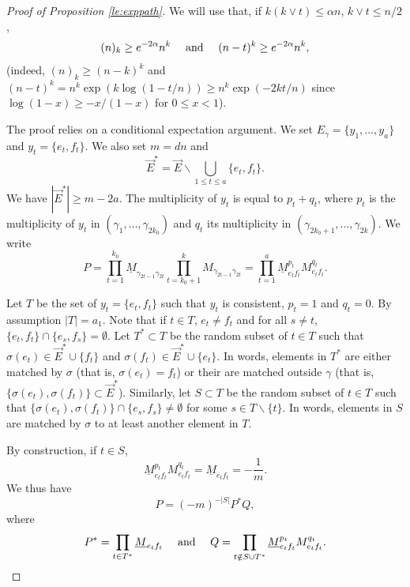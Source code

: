 \documentclass[11pt]{article}
\newcommand{\cE}{E}
\newcommand{\1}{1\!\!{\sf I}}\newcommand{\IND}{\1}
\begin{document}
\begin{proof}[Proof of Proposition \ref{le:exppath}] We will use that, if $k ( k \vee t)  \leq \alpha n$, $k \vee t \leq n/2$,  
\begin{equation}\label{eq:factpow}
(n)_k \geq   e^{-2\alpha} n^k  \quad  \hbox{ and } \quad (n - t )^k \geq e^{-2\alpha} n^k,
\end{equation}
(indeed, $(n)_k \geq (n - k)^k$ and $(n-t)^k =  n^{k} \exp ( k \log ( 1 - t /n)) \geq n^{k} \exp ( - 2 k t / n)$ since $\log (1 -x) \geq - x / (1 - x)$ for $0 \leq x  <1$). 

The proof relies on a conditional expectation argument. We set $\cE_\gamma = \{ y_1, \ldots , y_a  \}$ and $y_{t} = \{ e_t , f_t \}$. We also set $m = d n$ and
$$\vec E^* = \vec E \backslash \bigcup_{1 \leq t \leq a} \{ e_{t} , f_{t}  \}.$$
We have $| \vec E^* | \geq  m - 2 a$. The multiplicity of $y_t$ is equal to $p_t + q_t$, where $p_t$ is the multiplicity of $y_t$ in $(\gamma_1, \ldots, \gamma_{2k_0})$ and $q_t$ its multiplicity in $(\gamma_{2k_0 +1}, \ldots, \gamma_{2k})$.  We write 
$$
P =  \prod_{t= 1} ^{k_0}  \underline M_{\gamma_{2t-1} \gamma_{2t} } \prod_{t= k_0+1} ^{k}  M_{\gamma_{2t-1} \gamma_{2t} }  = \prod_{t=1}^a  \underline M_{e_tf_t} ^{p_t}  M_{e_tf_t} ^{q_t} . 
$$

Let $T$ be the set of $y_t = \{e_t , f_t \}$ such that $y_t$ is consistent, $p_t = 1$ and $q_t = 0$.  By assumption $|T| = a_1$. Note that if $t \in T$, $e_t \ne f_t$ and for all $s \ne t$, $\{ e_t,f_t \} \cap \{ e_s, f_s\} = \emptyset$. Let $T^*\subset T$ be the random subset of $t \in T$ such that $\sigma(e_t) \in \vec  E^* \cup \{ f_t \}$ and $\sigma(f_t) \in \vec E^* \cup \{ e_t \}$. In words, elements in $T^*$ are either  matched by $\sigma$ (that is, $\sigma(e_t) = f_t$) or their are matched outside $\gamma$ (that is, $\{ \sigma(e_t) , \sigma(f_t)\} \subset  \vec E^*$).  Similarly, let $S \subset T$ be the random subset of $t \in T$ such that $\{ \sigma(e_t) , \sigma(f_t) \} \cap  \{  e_s, f_s \} \ne \emptyset $ for some $s \in T \backslash \{t \}$. In words, elements in $S$ are matched by $\sigma$ to at least another element in $T$. 


By construction, if $t \in S$, 
$$
 \underline M_{e_tf_t} ^{p_t}  M_{e_tf_t} ^{q_t} =  \underline M_{e_tf_t}   =  -\frac 1 m.
$$
We thus have 
$$
P = (-m)^{-|S|} P^* Q,
$$
where 
$$
P^*  = \prod_{t \in T^*}  \underline M_{e_tf_t}  \quad \hbox{ and } \quad Q =  \prod_{t\notin  S \cup T^* }   \underline M_{e_tf_t} ^{p_t}  M_{e_tf_t} ^{q_t} . 
$$


\end{proof}
\end{document}
